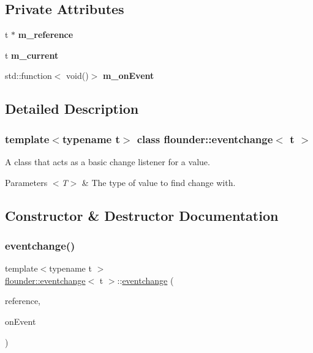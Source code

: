\subsection*{Private Attributes}
\begin{DoxyCompactItemize}
\item 
\mbox{\label{classflounder_1_1eventchange_afdea8ccaaa60b91bbe3c7a9f289d846b}} 
t $\ast$ {\bfseries m\+\_\+reference}
\item 
\mbox{\label{classflounder_1_1eventchange_a16b6829e51279a681619cdb2efbd1075}} 
t {\bfseries m\+\_\+current}
\item 
\mbox{\label{classflounder_1_1eventchange_ae2631399c18c52ffb7a61f65922609d3}} 
std\+::function$<$ void()$>$ {\bfseries m\+\_\+on\+Event}
\end{DoxyCompactItemize}


\subsection{Detailed Description}
\subsubsection*{template$<$typename t$>$\newline
class flounder\+::eventchange$<$ t $>$}

A class that acts as a basic change listener for a value. 


\begin{DoxyParams}{Parameters}
{\em $<$\+T$>$} & The type of value to find change with. \\
\hline
\end{DoxyParams}


\subsection{Constructor \& Destructor Documentation}
\mbox{\label{classflounder_1_1eventchange_aa10438da0bf89531d04211ede12f2ce1}} 
\subsubsection{\texorpdfstring{eventchange()}{eventchange()}}
{\footnotesize\ttfamily template$<$typename t $>$ \\
\hyperlink{classflounder_1_1eventchange}{flounder\+::eventchange}$<$ t $>$\+::\hyperlink{classflounder_1_1eventchange}{eventchange} (\begin{DoxyParamCaption}\item[{t $\ast$}]{reference,  }\item[{const std\+::function$<$ void()$>$ \&}]{on\+Event }\end{DoxyParamCaption})}



